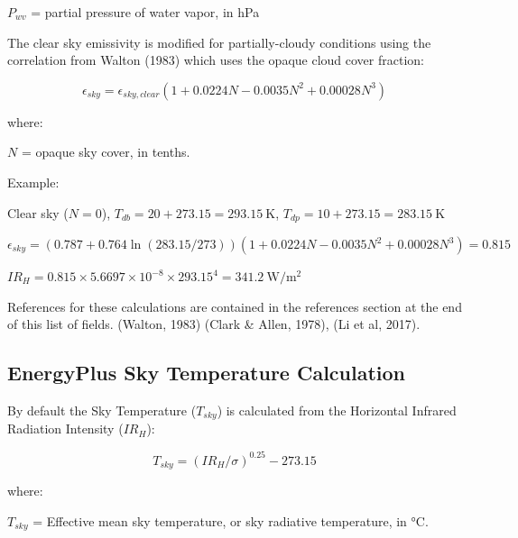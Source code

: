 $P_{wv}$ = partial pressure of water vapor, in \si{\hecto\pascal}
\newline

The clear sky emissivity is modified for partially-cloudy conditions using the correlation from Walton (1983) which uses the opaque cloud cover fraction:

\begin{equation}
\epsilon_{sky} = \epsilon_{sky, clear} \left(1 + 0.0224  N - 0.0035  N^2 + 0.00028  N^3\right)
\end{equation}

\noindent where:
\newline

$N$ = opaque sky cover, in tenths.
\newline

\noindent Example:
\newline

Clear sky ($N=0$), $T_{db} = 20 + 273.15 = \SI{293.15}{\kelvin}$, $T_{dp} = 10 + 273.15 = \SI{283.15}{\kelvin}$
\newline

$\epsilon_{sky} = \left(0.787 + 0.764  \ln\left(283.15/273\right)\right)  \left(1 + 0.0224  N - 0.0035  N^2 + 0.00028  N^3 \right) = 0.815$
\newline

$IR_H = 0.815 \times 5.6697 \times 10^{-8} \times 293.15^{4} = \SI{341.2}{\watt\per\meter\squared}$
\newline

References for these calculations are contained in the references section at the end of this list of fields. (Walton, 1983) (Clark \& Allen, 1978), (Li et al, 2017).

\subsection{EnergyPlus Sky Temperature Calculation}\label{energyplus-sky-temperature-calculation}

By default the Sky Temperature ($T_{sky}$) is calculated from the Horizontal Infrared Radiation Intensity ($IR_H$):

\begin{equation}
T_{sky} = \left(IR_H / \sigma\right)^{0.25} - 273.15
\end{equation}

\noindent where:
\newline

$T_{sky}$ = Effective mean sky temperature, or sky radiative temperature, in \si{\celsius}.
\newline

